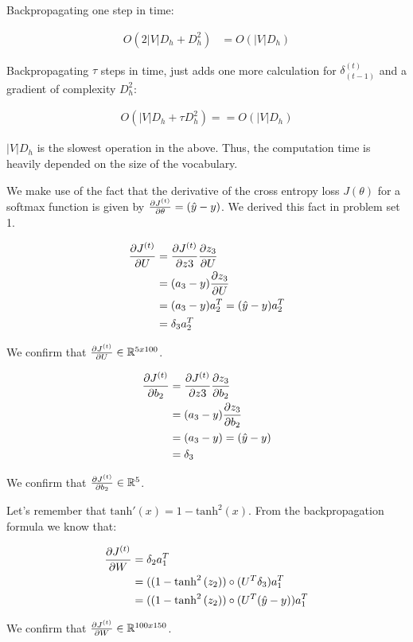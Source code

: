 Backpropagating one step in time:

\begin{align}
O(2\lvert V \rvert D_h + D_h^2) & = O(\lvert V \rvert D_h)
\end{align}

Backpropagating $\tau$ steps in time, just adds one more calculation for $\delta^{(t)}_{(t-1)}$ and a gradient of complexity $D^2_h$:

\begin{align}
O(\lvert V \rvert D_h + \tau D_h^2) = = O(\lvert V \rvert D_h)
\end{align}

$\lvert V \rvert D_h$ is the slowest operation in the above. Thus, the computation time is heavily depended on the size of the vocabulary.

We make use of the fact that the derivative of the cross entropy loss $J(\theta)$ for a softmax function is given by $\dJd{\theta} = (\hat{y} - y)$. We derived this fact in problem set 1.

\begin{align}
\dJd{U} & = \dJd{z3} \dd{z_3}{U} \\
& = (a_3 - y) \dd{z_3}{U} \\
& = (a_3 - y) a_2^T = (\hat{y} - y) a_2^T \\
& = \delta_3 a_2^T 
\end{align}

We confirm that $\dJd{U} \in \mathbb{R}^{5x100}$.

\begin{align}
\dJd{b_2} & = \dJd{z3} \dd{z_3}{b_2} \\
& = (a_3 - y) \dd{z_3}{b_2} \\
& = (a_3 - y)= (\hat{y} - y) \\
& = \delta_3
\end{align}

We confirm that $\dJd{b_2} \in \mathbb{R}^{5}$.

Let's remember that $\mathrm{tanh}'(x) = 1 - \mathrm{tanh}^2(x)$. From the backpropagation formula we know that:

\begin{align}
\dJd{W} & = \delta_2 a_1^T \\
& = ((1 - \tanh^2{(z_2)}) \circ (U^T \delta_3) a_1^T \\
& = ((1 - \tanh^2{(z_2)}) \circ (U^T (\hat{y} - y)) a_1^T
\end{align}

We confirm that $\dJd{W} \in \mathbb{R}^{100x150}$.

